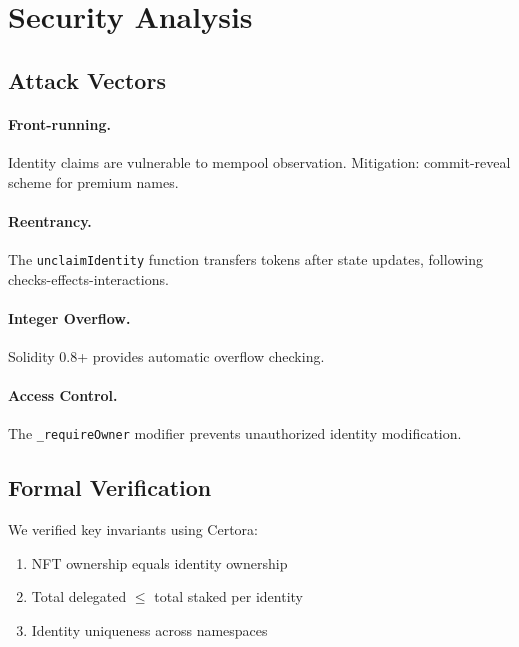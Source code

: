 \section{Security Analysis}


\subsection{Attack Vectors}

\paragraph{Front-running.} Identity claims are vulnerable to mempool observation. Mitigation: commit-reveal scheme for premium names.

\paragraph{Reentrancy.} The \texttt{unclaimIdentity} function transfers tokens after state updates, following checks-effects-interactions.

\paragraph{Integer Overflow.} Solidity 0.8+ provides automatic overflow checking.

\paragraph{Access Control.} The \texttt{\_requireOwner} modifier prevents unauthorized identity modification.

\subsection{Formal Verification}

We verified key invariants using Certora:
\begin{enumerate}
    \item NFT ownership equals identity ownership
    \item Total delegated $\leq$ total staked per identity
    \item Identity uniqueness across namespaces
\end{enumerate}


